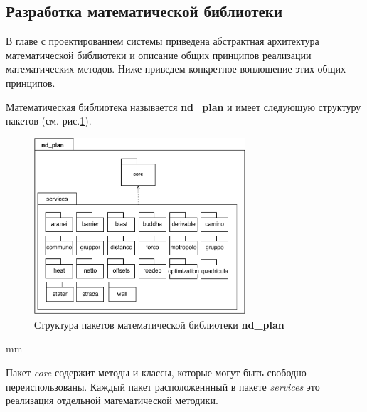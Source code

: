 \subsection{\large{Разработка математической библиотеки}}

В главе с проектированием системы приведена абстрактная архитектура математической библиотеки
и описание общих принципов реализации математических методов. Ниже приведем конкретное воплощение этих общих принципов.

Математическая библиотека называется \textbf{nd\_plan} и имеет следующую структуру пакетов
(см. рис.\ref{pic:implementation__math-packages}).

\begin{figure}[H]
	\hspace*{-2.5 cm}\includegraphics[width=0.7\textwidth]{implementation/pictures/math/packages}
	\caption{Структура пакетов математической библиотеки \textbf{nd\_plan}}
	\label{pic:implementation__math-packages}
\end{figure}
 mm

Пакет \textit{core} содержит методы и классы, которые могут быть свободно переиспользованы.
Каждый пакет расположеннный в пакете \textit{services} это реализация отдельной математической методики.


